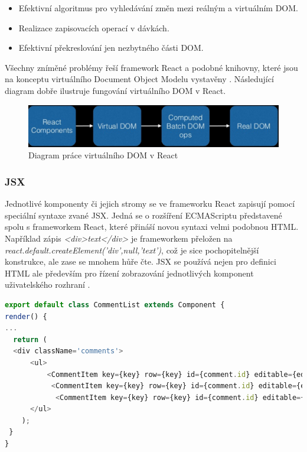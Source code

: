 \begin{itemize}
\item Efektivní algoritmus pro vyhledávání změn mezi reálným a virtuálním DOM.
\item Realizace zapisovacích operací v dávkách.
\item Efektivní překreslování jen nezbytného části DOM.
\end{itemize}

Všechny zníměné problémy řeší framework React a podobné knihovny, které jsou na konceptu virtuálního Document Object Modelu vystavěny \cite{react} \cite{virtualdom}. Následující diagram dobře ilustruje fungování virtuálního DOM v React.

\begin{figure}[h]
\begin{centering}
\includegraphics[scale=0.3]{obrazky/virtual_dom}
\par\end{centering}
\caption{Diagram práce virtuálního DOM v React \cite{react} \label{fig:virtual_dom}}
\end{figure}
\FloatBarrier

\subsubsection{JSX}
Jednotlivé komponenty či jejich stromy se ve frameworku React zapisují pomocí speciální syntaxe zvané JSX. Jedná se o rozšíření ECMAScriptu představené spolu s frameworkem React, které přináší novou syntaxi velmi podobnou HTML. Například zápis \textit{<div>text</div>} je frameworkem přeložen na \textit{react.default.createElement('div',null,'text')}, což je sice pochopitelnější konstrukce, ale zase se mnohem hůře čte. JSX se používá nejen pro definici HTML ale především pro řízení zobrazování jednotlivých komponent uživatelského rozhraní \cite{react} \cite{react_book}.

\begin{lstlisting}[language=Javascript,caption={Definice komponenty, která volá jiné komponenty v JSX}]
export default class CommentList extends Component {
render() {
...
  return (
  <div className='comments'>
      <ul>
          <CommentItem key={key} row={key} id={comment.id} editable={editable} comment={comments[0]} {...actions} />
           <CommentItem key={key} row={key} id={comment.id} editable={editable} comment={comments[1]} {...actions} />
            <CommentItem key={key} row={key} id={comment.id} editable={editable} comment={comments[2]} {...actions} />
      </ul>
 	);
 }
}
\end{lstlisting}

